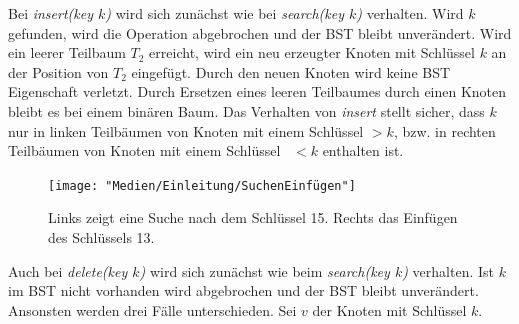 \documentclass[a4paper,12pt]{article}
\begin{document}
Bei \textit{insert(key $k$)} wird sich zunächst wie bei  \textit{search(key $k$)} verhalten. Wird $k$ gefunden, wird die Operation abgebrochen und der BST bleibt unverändert. Wird ein leerer Teilbaum $T_2$ erreicht, wird ein neu erzeugter Knoten mit Schlüssel $k$ an der Position von $T_2$ eingefügt. Durch den neuen Knoten wird keine BST Eigenschaft verletzt. Durch Ersetzen eines leeren Teilbaumes durch einen Knoten bleibt es bei einem binären Baum. Das Verhalten von  \textit{insert} stellt sicher, dass $k$ nur in linken Teilbäumen von Knoten mit einem Schlüssel $> k$, bzw. in rechten Teilbäumen von Knoten mit einem Schlüssel~ $< k$ enthalten ist.    \\
\begin{figure}[H]
	\centering
	\texttt{[image: "Medien/Einleitung/SuchenEinfügen"]}
	\caption{Links zeigt eine Suche nach dem Schlüssel 15. Rechts das Einfügen des Schlüssels 13.}
	\label{fig:SuchenEinfügen}
\end{figure}
\noindent Auch bei \textit{delete(key $k$)} wird sich zunächst wie beim  \textit{search(key $k$)} verhalten. Ist $k$ im BST nicht vorhanden wird abgebrochen und der BST bleibt unverändert. Ansonsten werden drei Fälle unterschieden.
Sei $v$ der Knoten mit Schlüssel $k$.
\end{document}
